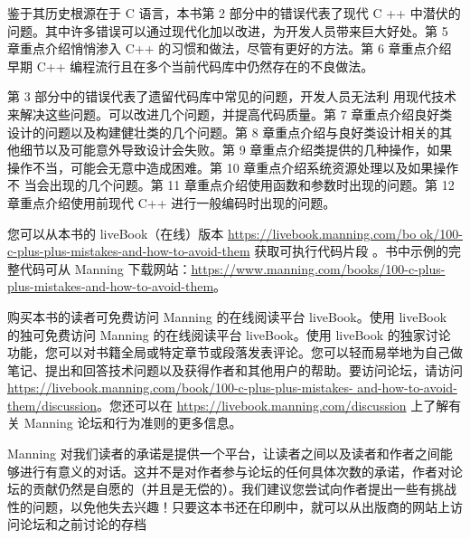 鉴于其历史根源在于 C 语言，本书第 2 部分中的错误代表了现代 C ++ 中潜伏的问题。其中许多错误可以通过现代化加以改进，为开发人员带来巨大好处。第 5 章重点介绍悄悄渗入 C++ 的习惯和做法，尽管有更好的方法。第 6 章重点介绍早期 C++ 编程流行且在多个当前代码库中仍然存在的不良做法。

第 3 部分中的错误代表了遗留代码库中常见的问题，开发人员无法利 用现代技术来解决这些问题。可以改进几个问题，并提高代码质量。第 7 章重点介绍良好类设计的问题以及构建健壮类的几个问题。第 8 章重点介绍与良好类设计相关的其他细节以及可能意外导致设计会失败。第 9 章重点介绍类提供的几种操作，如果操作不当，可能会无意中造成困难。第 10 章重点介绍系统资源处理以及如果操作不 当会出现的几个问题。第 11 章重点介绍使用函数和参数时出现的问题。第 12 章重点介绍使用前现代 C++ 进行一般编码时出现的问题。


您可以从本书的 liveBook（在线）版本 \url{https://livebook.manning.com/bo
ok/100-c-plus-plus-mistakes-and-how-to-avoid-them} 获取可执行代码片段
。书中示例的完整代码可从 Manning 下载网站：\url{https://www.manning.com/books/100-c-plus-plus-mistakes-and-how-to-avoid-them}。


购买本书的读者可免费访问 Manning 的在线阅读平台 liveBook。使用 liveBook 的独可免费访问 Manning 的在线阅读平台 liveBook。使用 liveBook 的独家讨论功能，您可以对书籍全局或特定章节或段落发表评论。您可以轻而易举地为自己做笔记、提出和回答技术问题以及获得作者和其他用户的帮助。要访问论坛，请访问 \url{https://livebook.manning.com/book/100-c-plus-plus-mistakes- and-how-to-avoid-them/discussion}。您还可以在 \url{https://livebook.manning.com/discussion} 上了解有关 Manning 论坛和行为准则的更多信息。

Manning 对我们读者的承诺是提供一个平台，让读者之间以及读者和作者之间能够进行有意义的对话。这并不是对作者参与论坛的任何具体次数的承诺，作者对论坛的贡献仍然是自愿的（并且是无偿的）。我们建议您尝试向作者提出一些有挑战性的问题，以免他失去兴趣！只要这本书还在印刷中，就可以从出版商的网站上访问论坛和之前讨论的存档
